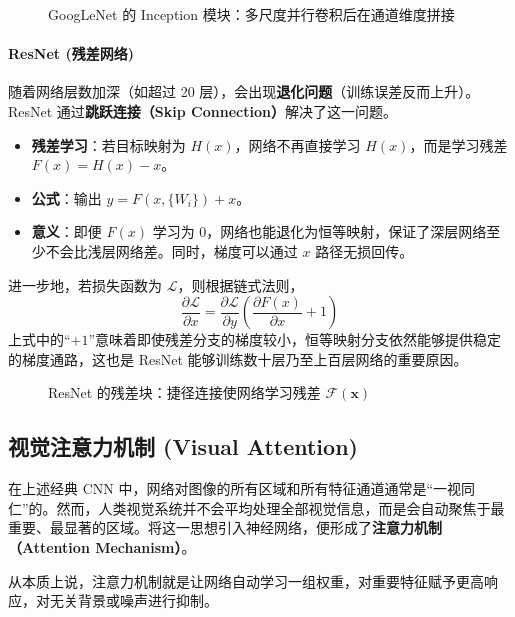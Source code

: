 \begin{figure}[H]
  \centering
  \resizebox{0.9\textwidth}{!}{}
  \caption{GoogLeNet 的 Inception 模块：多尺度并行卷积后在通道维度拼接}
  \label{fig:ch09_orig11}
\end{figure}

\paragraph{ResNet (残差网络)}
随着网络层数加深（如超过 20 层），会出现\textbf{退化问题}（训练误差反而上升）。ResNet 通过\textbf{跳跃连接（Skip Connection）}解决了这一问题。
\begin{itemize}
    \item \textbf{残差学习}：若目标映射为 $H(x)$，网络不再直接学习 $H(x)$，而是学习残差 $F(x) = H(x) - x$。
    \item \textbf{公式}：输出 $y = F(x, \{W_i\}) + x$。
    \item \textbf{意义}：即便 $F(x)$ 学习为 0，网络也能退化为恒等映射，保证了深层网络至少不会比浅层网络差。同时，梯度可以通过 $x$ 路径无损回传。
\end{itemize}

进一步地，若损失函数为 $\mathcal{L}$，则根据链式法则，
\begin{equation}
\frac{\partial \mathcal{L}}{\partial x}
=
\frac{\partial \mathcal{L}}{\partial y}
\left(
\frac{\partial F(x)}{\partial x}+1
\right)
\end{equation}
上式中的“$+1$”意味着即使残差分支的梯度较小，恒等映射分支依然能够提供稳定的梯度通路，这也是 ResNet 能够训练数十层乃至上百层网络的重要原因。

\begin{figure}[H]
  \centering
  
  \caption{ResNet 的残差块：捷径连接使网络学习残差 $\mathcal{F}(\mathbf{x})$}
  \label{fig:ch09_orig12}
\end{figure}

\subsection{视觉注意力机制 (Visual Attention)}

在上述经典 CNN 中，网络对图像的所有区域和所有特征通道通常是“一视同仁”的。然而，人类视觉系统并不会平均处理全部视觉信息，而是会自动聚焦于最重要、最显著的区域。将这一思想引入神经网络，便形成了\textbf{注意力机制（Attention Mechanism）}。

从本质上说，注意力机制就是让网络自动学习一组权重，对重要特征赋予更高响应，对无关背景或噪声进行抑制。

